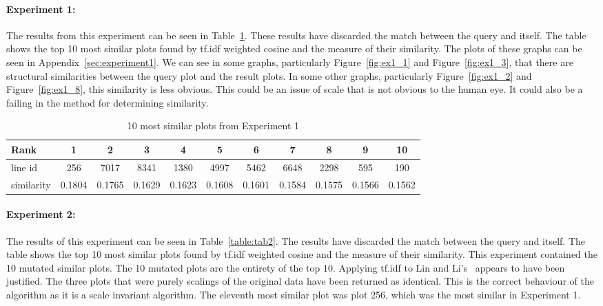 \paragraph*{Experiment 1:} The results from this experiment can be seen in Table~\ref{table:tab1}.  These results have discarded the match between the query and itself.  The table shows the top 10 most similar plots found by \ac{tf.idf} weighted cosine and the measure of their similarity.  The plots of these graphs can be seen in Appendix~\ref{sec:experiment1}.  We can see in some graphs, particularly Figure~\ref{fig:ex1_1} and Figure~\ref{fig:ex1_3}, that there are structural similarities between the query plot and the result plots.  In some other graphs, particularly Figure~\ref{fig:ex1_2} and Figure~\ref{fig:ex1_8}, this similarity is less obvious.  This could be an issue of scale that is not obvious to the human eye.  It could also be a failing in the method for determining similarity.

\begin{table}[h]
\begin{center}
    \resizebox{0.9\textwidth}{!} {\begin{minipage}{\textwidth}
    \begin{tabular}{ | l | c | c | c | c | c | c | c | c | c | c | }
        \hline
        Rank & 1 & 2 & 3 & 4 & 5 & 6 & 7 & 8 & 9 & 10 \\
        \hline
        line id & 256 & 7017 & 8341 & 1380 & 4997 & 5462 & 6648 & 2298 & 595 & 190 \\
        \hline
        similarity & 0.1804 & 0.1765 & 0.1629 & 0.1623 & 0.1608 & 0.1601 & 0.1584 & 0.1575 & 0.1566 & 0.1562 \\
        \hline
    \end{tabular}
    \caption{10 most similar plots from Experiment 1}
    \label{table:tab1}
    \end{minipage}}
\end{center}
\end{table}

\paragraph*{Experiment 2:} The results of this experiment can be seen in Table~\ref{table:tab2}.  The results have discarded the match between the query and itself.  The table shows the top 10 most similar plots found by \ac{tf.idf} weighted cosine and the measure of their similarity.  This experiment contained the 10 mutated similar plots.  The 10 mutated plots are the entirety of the top 10.  Applying \ac{tf.idf} to Lin and Li's~\cite{structural_similarity} appears to have been justified.  The three plots that were purely scalings of the original data have been returned as identical.  This is the correct behaviour of the algorithm as it is a scale invariant algorithm.  The eleventh most similar plot was plot 256, which was the most similar in Experiment 1.


